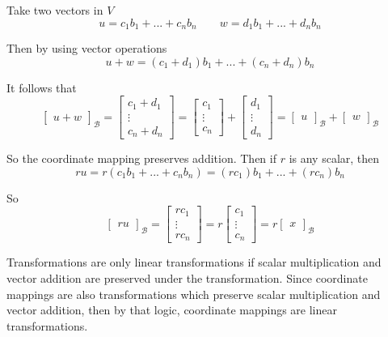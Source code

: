 \documentclass{article}
\begin{document}
  Take two vectors in $ V $
  \[
    u=c_1b_1+...+c_nb_n \qquad w=d_1b_1+...+d_nb_n
  \]

  Then by using vector operations
  \[
    u+w=(c_1+d_1)b_1+...+(c_n+d_n)b_n
  \]

  It follows that
  \[
    \begin{bmatrix}
      u+w
    \end{bmatrix}_\mathcal{B}=\begin{bmatrix}
      c_1+d_1\\
      \vdots\\
      c_n+d_n
    \end{bmatrix}=\begin{bmatrix}
      c_1\\
      \vdots\\
      c_n
    \end{bmatrix}+
    \begin{bmatrix}
      d_1\\
      \vdots\\
      d_n
    \end{bmatrix}=
    \begin{bmatrix}
      u
    \end{bmatrix}_\mathcal{B}+
    \begin{bmatrix}
      w
    \end{bmatrix}_\mathcal{B}
  \]
  
  So the coordinate mapping preserves addition. Then if $ r $ is any scalar, then
  \[
    ru=r(c_1b_1+...+c_nb_n)=(rc_1)b_1+...+(rc_n)b_n
  \]

  So
  \[
    \begin{bmatrix}
      ru
    \end{bmatrix}_\mathcal{B}=
    \begin{bmatrix}
      rc_1\\
      \vdots\\
      rc_n
    \end{bmatrix}=
    r\begin{bmatrix}
      c_1\\
      \vdots\\
      c_n
    \end{bmatrix}=r\begin{bmatrix}
      x
    \end{bmatrix}_\mathcal{B}
  \]

   Transformations are only linear transformations if scalar multiplication and vector addition are preserved under the transformation. Since coordinate mappings are also transformations which preserve scalar multiplication and vector addition, then by that logic, coordinate mappings are linear transformations.
\end{document}
